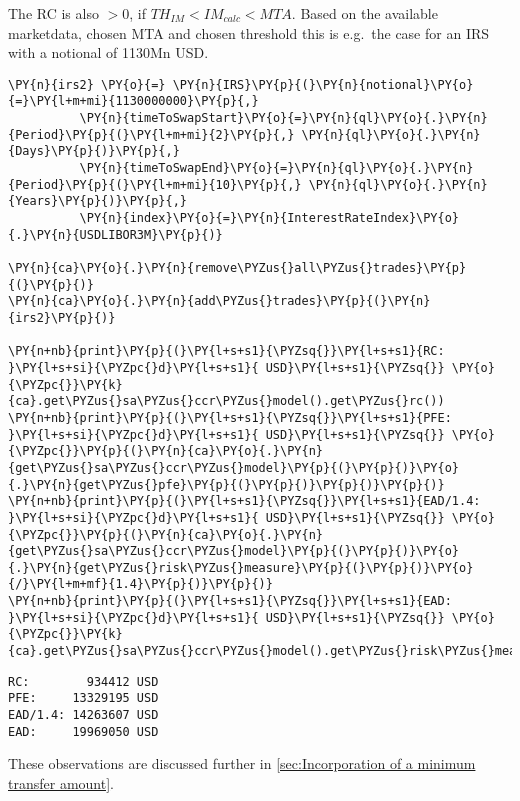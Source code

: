 The RC is also \(>0\), if \(TH_{IM} < IM_{calc} < MTA\). Based on the
available marketdata, chosen MTA and chosen threshold this is e.g.~the
case for an IRS with a notional of 1130Mn USD.

    \begin{tcolorbox}[breakable, size=fbox, boxrule=1pt, pad at break*=1mm,colback=cellbackground, colframe=cellborder]
\begin{Verbatim}[commandchars=\\\{\}]
\PY{n}{irs2} \PY{o}{=} \PY{n}{IRS}\PY{p}{(}\PY{n}{notional}\PY{o}{=}\PY{l+m+mi}{1130000000}\PY{p}{,}
          \PY{n}{timeToSwapStart}\PY{o}{=}\PY{n}{ql}\PY{o}{.}\PY{n}{Period}\PY{p}{(}\PY{l+m+mi}{2}\PY{p}{,} \PY{n}{ql}\PY{o}{.}\PY{n}{Days}\PY{p}{)}\PY{p}{,}
          \PY{n}{timeToSwapEnd}\PY{o}{=}\PY{n}{ql}\PY{o}{.}\PY{n}{Period}\PY{p}{(}\PY{l+m+mi}{10}\PY{p}{,} \PY{n}{ql}\PY{o}{.}\PY{n}{Years}\PY{p}{)}\PY{p}{,}
          \PY{n}{index}\PY{o}{=}\PY{n}{InterestRateIndex}\PY{o}{.}\PY{n}{USDLIBOR3M}\PY{p}{)}

\PY{n}{ca}\PY{o}{.}\PY{n}{remove\PYZus{}all\PYZus{}trades}\PY{p}{(}\PY{p}{)}
\PY{n}{ca}\PY{o}{.}\PY{n}{add\PYZus{}trades}\PY{p}{(}\PY{n}{irs2}\PY{p}{)}

\PY{n+nb}{print}\PY{p}{(}\PY{l+s+s1}{\PYZsq{}}\PY{l+s+s1}{RC:        }\PY{l+s+si}{\PYZpc{}d}\PY{l+s+s1}{ USD}\PY{l+s+s1}{\PYZsq{}} \PY{o}{\PYZpc{}}\PY{k}{ca}.get\PYZus{}sa\PYZus{}ccr\PYZus{}model().get\PYZus{}rc())
\PY{n+nb}{print}\PY{p}{(}\PY{l+s+s1}{\PYZsq{}}\PY{l+s+s1}{PFE:     }\PY{l+s+si}{\PYZpc{}d}\PY{l+s+s1}{ USD}\PY{l+s+s1}{\PYZsq{}} \PY{o}{\PYZpc{}}\PY{p}{(}\PY{n}{ca}\PY{o}{.}\PY{n}{get\PYZus{}sa\PYZus{}ccr\PYZus{}model}\PY{p}{(}\PY{p}{)}\PY{o}{.}\PY{n}{get\PYZus{}pfe}\PY{p}{(}\PY{p}{)}\PY{p}{)}\PY{p}{)}
\PY{n+nb}{print}\PY{p}{(}\PY{l+s+s1}{\PYZsq{}}\PY{l+s+s1}{EAD/1.4: }\PY{l+s+si}{\PYZpc{}d}\PY{l+s+s1}{ USD}\PY{l+s+s1}{\PYZsq{}} \PY{o}{\PYZpc{}}\PY{p}{(}\PY{n}{ca}\PY{o}{.}\PY{n}{get\PYZus{}sa\PYZus{}ccr\PYZus{}model}\PY{p}{(}\PY{p}{)}\PY{o}{.}\PY{n}{get\PYZus{}risk\PYZus{}measure}\PY{p}{(}\PY{p}{)}\PY{o}{/}\PY{l+m+mf}{1.4}\PY{p}{)}\PY{p}{)}
\PY{n+nb}{print}\PY{p}{(}\PY{l+s+s1}{\PYZsq{}}\PY{l+s+s1}{EAD:     }\PY{l+s+si}{\PYZpc{}d}\PY{l+s+s1}{ USD}\PY{l+s+s1}{\PYZsq{}} \PY{o}{\PYZpc{}}\PY{k}{ca}.get\PYZus{}sa\PYZus{}ccr\PYZus{}model().get\PYZus{}risk\PYZus{}measure())
\end{Verbatim}
\end{tcolorbox}

    \begin{Verbatim}[commandchars=\\\{\}]
RC:        934412 USD
PFE:     13329195 USD
EAD/1.4: 14263607 USD
EAD:     19969050 USD
    \end{Verbatim}

    These observations are discussed further in
\ref{sec:Incorporation of a minimum transfer amount}.


